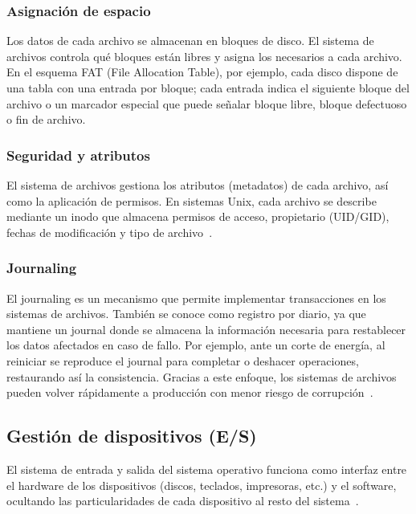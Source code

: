\subsubsection{Asignación de espacio}
Los datos de cada archivo se almacenan en bloques de disco. El sistema de archivos controla qué bloques están libres y asigna los necesarios a cada archivo. 
En el esquema FAT (File Allocation Table), por ejemplo, cada disco dispone de una tabla con una entrada por bloque; cada entrada indica el siguiente bloque del archivo o un marcador especial que puede señalar bloque libre, bloque defectuoso o fin de archivo.

\subsubsection{Seguridad y atributos}
El sistema de archivos gestiona los atributos (metadatos) de cada archivo, así como la aplicación de permisos. 
En sistemas Unix, cada archivo se describe mediante un inodo que almacena permisos de acceso, propietario (UID/GID), fechas de modificación y tipo de archivo~\citep{ual2005}.
\subsubsection{Journaling}
El journaling es un mecanismo que permite implementar transacciones en los sistemas de archivos. 
También se conoce como registro por diario, ya que mantiene un journal donde se almacena la información necesaria para restablecer los datos afectados en caso de fallo. 
Por ejemplo, ante un corte de energía, al reiniciar se reproduce el journal para completar o deshacer operaciones, restaurando así la consistencia. 
Gracias a este enfoque, los sistemas de archivos pueden volver rápidamente a producción con menor riesgo de corrupción~\citep{wikipedia3}.

\subsection{Gestión de dispositivos (E/S)}
El sistema de entrada y salida del sistema operativo funciona como interfaz entre el hardware de los dispositivos (discos, teclados, impresoras, etc.) y el software, 
ocultando las particularidades de cada dispositivo al resto del sistema~\citep{torres2024}.  

